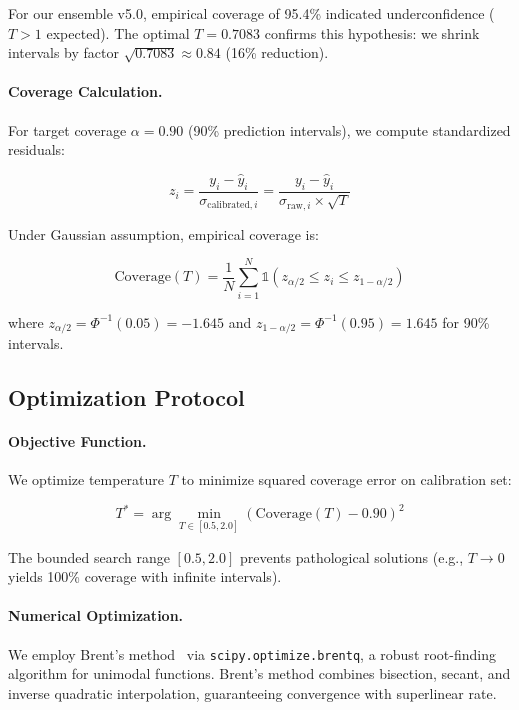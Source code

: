 For our ensemble v5.0, empirical coverage of 95.4\% indicated underconfidence ($T > 1$ expected). The optimal $T = 0.7083$ confirms this hypothesis: we shrink intervals by factor $\sqrt{0.7083} \approx 0.84$ (16\% reduction).

\paragraph{Coverage Calculation.}
For target coverage $\alpha = 0.90$ (90\% prediction intervals), we compute standardized residuals:

\begin{equation}
z_i = \frac{y_i - \hat{y}_i}{\sigma_{\text{calibrated}, i}} = \frac{y_i - \hat{y}_i}{\sigma_{\text{raw}, i} \times \sqrt{T}}
\end{equation}

Under Gaussian assumption, empirical coverage is:

\begin{equation}
\text{Coverage}(T) = \frac{1}{N} \sum_{i=1}^N \mathbb{1}\left( z_{\alpha/2} \leq z_i \leq z_{1-\alpha/2} \right)
\end{equation}

where $z_{\alpha/2} = \Phi^{-1}(0.05) = -1.645$ and $z_{1-\alpha/2} = \Phi^{-1}(0.95) = 1.645$ for 90\% intervals.

\subsection{Optimization Protocol}

\paragraph{Objective Function.}
We optimize temperature $T$ to minimize squared coverage error on calibration set:

\begin{equation}
T^* = \arg\min_{T \in [0.5, 2.0]} \left( \text{Coverage}(T) - 0.90 \right)^2
\label{eq:temperature-objective}
\end{equation}

The bounded search range $[0.5, 2.0]$ prevents pathological solutions (e.g., $T \to 0$ yields 100\% coverage with infinite intervals).

\paragraph{Numerical Optimization.}
We employ Brent's method~\cite{brent1973algorithms} via \texttt{scipy.optimize.brentq}, a robust root-finding algorithm for unimodal functions. Brent's method combines bisection, secant, and inverse quadratic interpolation, guaranteeing convergence with superlinear rate.

